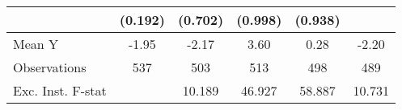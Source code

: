 {\begin{tabular}{l*{5}{c}}
            &     (0.192)         &     (0.702)         &     (0.998)         &     (0.938)         &                     \\
\midrule
Mean Y      &       -1.95         &       -2.17         &        3.60         &        0.28         &       -2.20         \\
Observations&         537         &         503         &         513         &         498         &         489         \\
Exc. Inst. F-stat&                     &      10.189         &      46.927         &      58.887         &      10.731         \\
\bottomrule
\end{tabular}
}

